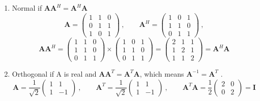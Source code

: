 \documentclass[12pt]{article}
\newcommand{\ve}[1]{\ensuremath{\mathbf{#1}}}
\begin{document}
\begin{enumerate}
\item Normal if $\ve{A}\ve{A}^H = \ve{A}^H\ve{A}$
%
\begin{equation}
\ve{A} = \begin{pmatrix}
   1 & 1 & 0 \\
   0 & 1 & 1 \\
   1 & 0 & 1
\end{pmatrix}\:, \qquad
\ve{A}^H = \begin{pmatrix}
   1 & 0 & 1 \\
   1 & 1 & 0 \\
   0 & 1 & 1
\end{pmatrix}\:,\nonumber
\end{equation}
%
\begin{equation}
\ve{AA}^H = \begin{pmatrix}
   1 & 1 & 0 \\
   1 & 1 & 0 \\
   0 & 1 & 1 
\end{pmatrix}  \times
\begin{pmatrix}
   1 & 0 & 1 \\
   1 & 1 & 0 \\
   0 & 1 & 1 
\end{pmatrix} =
\begin{pmatrix}
   2 & 1 & 1 \\
   1 & 2 & 1 \\
   1 & 1 & 2 
\end{pmatrix} = \ve{A}^H\ve{A}\nonumber
\end{equation}


\item Orthogonal if A is real and $\ve{AA}^T = \ve{A}^T\ve{A}$, which means $\ve{A}^{-1} = \ve{A}^T$ .
%
\begin{equation}
\ve{A} = \frac{1}{\sqrt{2}}\begin{pmatrix}
   1 & 1 \\
   1 & -1 
\end{pmatrix}\:, \qquad
\ve{A}^T = \frac{1}{\sqrt{2}}\begin{pmatrix}
   1 & 1 \\
   1 & -1 
\end{pmatrix}\:,\qquad
\ve{A}^T\ve{A} = \frac{1}{2}\begin{pmatrix}
   2 & 0 \\
   0 & 2 
\end{pmatrix} = \ve{I} \nonumber
\end{equation}

\end{enumerate}
\end{document}
